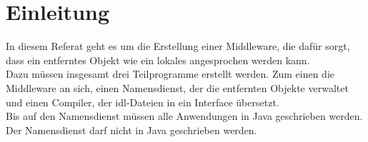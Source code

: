 %
\chapter{Einleitung}
In diesem Referat geht es um die Erstellung einer Middleware, die dafür sorgt, dass ein entferntes Objekt wie ein lokales angesprochen werden kann.\\
Dazu müssen insgesamt drei Teilprogramme erstellt werden. Zum einen die Middleware an sich, einen Namensdienst, der die entfernten Objekte verwaltet und einen Compiler, der idl-Dateien in ein Interface übersetzt.\\
Bis auf den Namensdienst müssen alle Anwendungen in Java geschrieben werden. Der Namensdienst darf nicht in Java geschrieben werden.